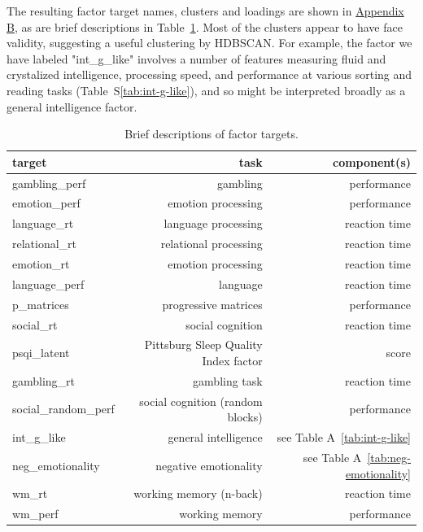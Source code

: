 \documentclass{article}
\begin{document}
The resulting factor target names, clusters and loadings are shown in
\hyperref[sec:appendix-b]{Appendix B}, as are brief descriptions in
Table~\ref{tab:target-descs}. Most of the clusters appear to have face validity,
suggesting a useful clustering by HDBSCAN\@. For example, the factor we have
labeled "int\_g\_like" involves a number of features measuring fluid and
crystalized intelligence, processing speed, and performance at various
sorting and reading tasks (Table~S\ref{tab:int-g-like}), and so
might be interpreted broadly as a general intelligence factor.


\begin{table}[H]
\centering
\caption{Brief descriptions of factor targets. } \label{tab:target-descs}
\begin{tabular}{lrr}
	\toprule
	target & task & component(s)  \\
	\midrule
	gambling\_perf       & gambling              & performance   \\
	emotion\_perf        & emotion processing    & performance   \\
	language\_rt         & language processing   & reaction time \\
	relational\_rt       & relational processing & reaction time \\
	emotion\_rt          & emotion processing    & reaction time \\
	language\_perf       & language              & reaction time \\
	p\_matrices          & progressive matrices  & performance   \\
	social\_rt           & social cognition      & reaction time \\
	psqi\_latent         & Pittsburg Sleep Quality Index factor \citep{buyssePittsburghSleepQuality1989} & score \\
	gambling\_rt         & gambling task         & reaction time \\
	social\_random\_perf & social cognition (random blocks) & performance \\
	int\_g\_like         & general intelligence & see Table A~\ref{tab:int-g-like} \\
	neg\_emotionality    & negative emotionality & see Table A~\ref{tab:neg-emotionality} \\
	wm\_rt               & working memory (n-back) & reaction time \\
	wm\_perf             & working memory          & performance \\
	\bottomrule
\end{tabular}
\end{table}
\end{document}

